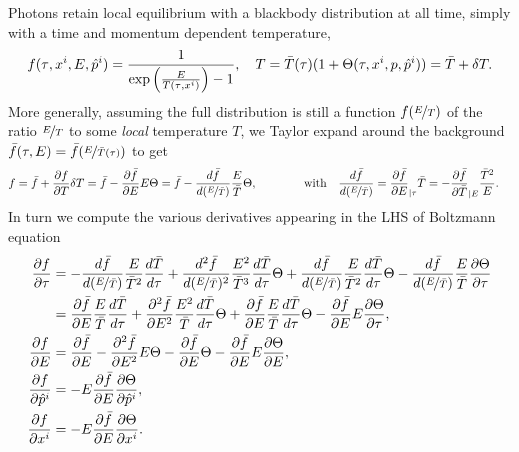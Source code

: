 Photons retain local equilibrium with a blackbody distribution at all time, simply with a time and momentum dependent temperature, 
{\small
\begin{equation}\label{eq:local_temp_photons}
    f(\operatorname{\tau}, x^i, E, \hat{p}^i) = \frac{1}{\exp\left(\frac{E}{T(\operatorname{\tau}, x^i)}\right) - 1}, \quad T=\bar{T}(\tau)(1+\Theta(\tau, x^i, p, \hat{p}^i))=\bar{T}+\delta T.
\end{equation}}
More generally, assuming the full distribution is still a function $f(\nicefrac{E}{T})$ of the ratio $\nicefrac{E}{T}$ to some \emph{local} temperature $T$, we Taylor expand around the background $\bar{f}(\tau,E)=\bar{f}(\nicefrac{E}{\bar{T}(\tau)})$ to get
{\small
\begin{align}
    f&= \bar{f}+\frac{\partial f}{\partial T}\delta T = \bar{f}-\frac{\partial \bar{f}}{\partial E}E\Theta = \bar{f}-\frac{d \bar{f}}{d (\nicefrac{E}{\bar{T}})} \frac{E}{\bar{T}}\Theta,\qquad\qquad \text{with}\quad \frac{d \bar{f}}{d (\nicefrac{E}{\bar{T}})}=\frac{\partial \bar{f}}{\partial E}_{|\tau}\bar{T}=-\frac{\partial \bar{f}}{\partial \bar{T}}_{|E}\frac{\bar{T}^2}{E}.
\end{align}}
In turn we compute the various derivatives appearing in the LHS of Boltzmann equation 
{\small
\begin{align}\label{eq:photon_distribution_expansion}
\begin{aligned}
    \frac{\partial f}{\partial \tau}&= -\frac{d\bar{f}}{d(\nicefrac{E}{\bar{T}})}\frac{E}{\bar{T}^2}\frac{d\bar{T}}{d\tau}+ \frac{d^2\bar{f}}{d(\nicefrac{E}{\bar{T}})^2} \frac{E^2}{\bar{T}^3}\frac{d\bar{T}}{d\tau}\Theta+\frac{d \bar{f}}{d(\nicefrac{E}{\bar{T}})}\frac{E}{\bar{T}^2}\frac{d\bar{T}}{d\tau}\Theta-\frac{d \bar{f}}{d (\nicefrac{E}{\bar{T}})} \frac{E}{\bar{T}}\frac{\partial \Theta}{\partial \tau}\\
    &= \frac{\partial \bar{f}}{\partial E}\frac{E}{\bar{T}}\frac{d\bar{T}}{d\tau}+\frac{\partial^2 \bar{f}}{\partial E^2}\frac{E^2}{\bar{T}}\frac{d\bar{T}}{d\tau}\Theta+\frac{\partial \bar{f}}{\partial E}\frac{E}{\bar{T}}\frac{d\bar{T}}{d\tau}\Theta-\frac{\partial \bar{f}}{\partial E}E\frac{\partial \Theta}{\partial \tau},
    \\
    \frac{\partial f}{\partial E}&=\frac{\partial \bar{f}}{\partial E}-\frac{\partial^2 \bar{f}}{\partial E^2}E\Theta-\frac{\partial \bar{f}}{\partial E}\Theta-\frac{\partial \bar{f}}{\partial E}E\frac{\partial \Theta}{\partial E},\\
    \frac{\partial f}{\partial \hat{p}^i}&=-E\frac{\partial \bar{f}}{\partial E}\frac{\partial \Theta}{\partial \hat{p}^i},\\
    \frac{\partial f}{\partial x^i}&=-E\frac{\partial \bar{f}}{\partial E}\frac{\partial \Theta}{\partial x^i}.
\end{aligned}
\end{align}}
